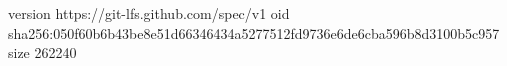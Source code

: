 version https://git-lfs.github.com/spec/v1
oid sha256:050f60b6b43be8e51d66346434a5277512fd9736e6de6cba596b8d3100b5c957
size 262240
